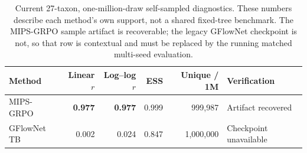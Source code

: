 \begin{table}[htbp]
\centering
\caption{Current 27-taxon, one-million-draw self-sampled diagnostics. These
numbers describe each method's own support, not a shared fixed-tree benchmark.
The MIPS-GRPO sample artifact is recoverable; the legacy GFlowNet checkpoint is
not, so that row is contextual and must be replaced by the running matched
multi-seed evaluation.}
\label{tab:phylo-27-main}
\begin{tabular}{lrrrrl}
\toprule
Method & Linear \(r\) & Log--log \(r\) & ESS & Unique / 1M & Verification \\
\midrule
MIPS-GRPO & \textbf{0.977} & \textbf{0.977} & 0.999 & 999,987 & Artifact recovered \\
GFlowNet TB & 0.002 & 0.024 & 0.847 & 1,000,000 & Checkpoint unavailable \\
\bottomrule
\end{tabular}
\end{table}

